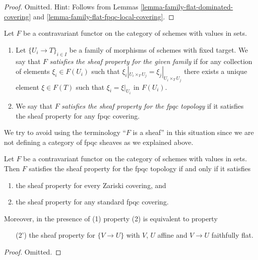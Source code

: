 \begin{proof}
Omitted. Hint: Follows from Lemmas
\ref{lemma-family-flat-dominated-covering} and
\ref{lemma-family-flat-fpqc-local-covering}.
\end{proof}

\begin{definition}
\label{definition-sheaf-property-fpqc}
Let $F$ be a contravariant functor on the category
of schemes with values in sets.
\begin{enumerate}
\item Let $\{U_i \to T\}_{i \in I}$ be a family of morphisms
of schemes with fixed target.
We say that $F$ {\it satisfies the sheaf property for the given family}
if for any collection of elements $\xi_i \in F(U_i)$ such that
$\xi_i|_{U_i \times_T U_j} = \xi_j|_{U_i \times_T U_j}$
there exists a unique element
$\xi \in F(T)$ such that $\xi_i = \xi|_{U_i}$ in $F(U_i)$.
\item We say that $F$ {\it satisfies the sheaf property for the
fpqc topology} if it satisfies the sheaf property for any
fpqc covering.
\end{enumerate}
\end{definition}

\noindent
We try to avoid using the terminology ``$F$ is a sheaf'' in this
situation since we are not defining a category of fpqc sheaves
as we explained above.

\begin{lemma}
\label{lemma-sheaf-property-fpqc}
Let $F$ be a contravariant functor on the category
of schemes with values in sets. Then $F$ satisfies
the sheaf property for the fpqc topology if and only
if it satisfies
\begin{enumerate}
\item the sheaf property for every Zariski covering, and
\item the sheaf property for any standard fpqc covering.
\end{enumerate}
Moreover, in the presence of (1) property (2) is equivalent to
property
\begin{enumerate}
\item[(2')] the sheaf property for $\{V \to U\}$
with $V$, $U$ affine and $V \to U$ faithfully flat.
\end{enumerate}
\end{lemma}

\begin{proof}
Omitted.
\end{proof}












